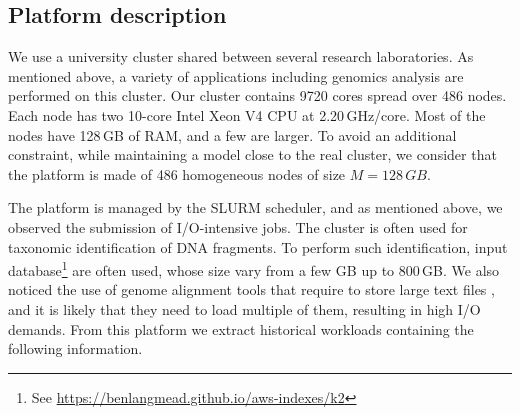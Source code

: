 \documentclass[conference]{IEEEtran}
\newcommand{\memory}{\ensuremath{\mathit{M}}\xspace}
\begin{document}
\subsection{Platform description}
We use a university cluster shared between several research laboratories. As mentioned above, a variety of applications including genomics analysis are performed on this cluster.
Our cluster contains 9720 cores spread over 486 nodes. Each node has two
10-core Intel Xeon V4 CPU at 2.20\,GHz/core.
Most of the nodes have 128\,GB of RAM, and a few are larger.
To avoid an additional constraint, while maintaining a model close to the real cluster,
we consider that the platform is made of 486 homogeneous nodes of size
$\memory = 128\,GB$.


The platform is managed by the SLURM scheduler, and as mentioned above, we observed the submission of I/O-intensive jobs.
The cluster is often used for taxonomic identification of DNA fragments. 
To perform such identification, 
input database\footnote{See \url{https://benlangmead.github.io/aws-indexes/k2}} are often used,
whose size vary from a few GB up to 800\,GB.
We also noticed the use of genome alignment tools that require to store large text files
, and it is likely that they need to load multiple of them, resulting in high I/O demands.
From this platform we extract historical workloads containing the following information.
\end{document}

